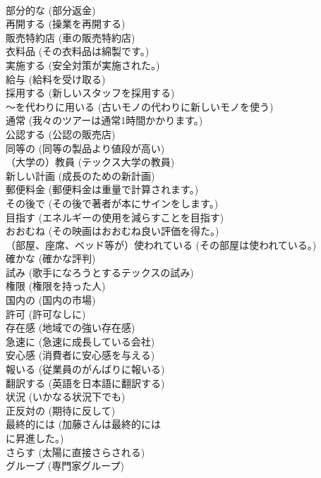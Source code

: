 \documentclass[8pt]{extreport}
\begin{document}
\begin{CJK}{UTF8}{min}
\\	部分的な	(部分返金)		
\\	再開する	(操業を再開する)		
\\	販売特約店	(車の販売特約店)		
\\	衣料品	(その衣料品は綿製です。)		
\\	実施する	(安全対策が実施された。)		
\\	給与	(給料を受け取る)		
\\	採用する	(新しいスタッフを採用する)		
\\	～を代わりに用いる	(古いモノの代わりに新しいモノを使う)		
\\	通常	(我々のツアーは通常1時間かかります。)		
\\	公認する	(公認の販売店)		
\\	同等の	(同等の製品より値段が高い)		
\\	（大学の）教員	(テックス大学の教員)		
\\	新しい計画	(成長のための新計画)		
\\	郵便料金	(郵便料金は重量で計算されます。)		
\\	その後で	(その後で著者が本にサインをします。)		
\\	目指す	(エネルギーの使用を減らすことを目指す)		
\\	おおむね	(その映画はおおむね良い評価を得た。)		
\\	（部屋、座席、ベッド等が）使われている	(その部屋は使われている。)		
\\	確かな	(確かな評判)		
\\	試み	(歌手になろうとするテックスの試み)		
\\	権限	(権限を持った人)		
\\	国内の	(国内の市場)		
\\	許可	(許可なしに)		
\\	存在感	(地域での強い存在感)		
\\	急速に	(急速に成長している会社)		
\\	安心感	(消費者に安心感を与える)		
\\	報いる	(従業員のがんばりに報いる)		
\\	翻訳する	(英語を日本語に翻訳する)		
\\	状況	(いかなる状況下でも)		
\\	正反対の	(期待に反して)		
\\	最終的には	(加藤さんは最終的には
\\	に昇進した。)		
\\	さらす	(太陽に直接さらされる)		
\\	グループ	(専門家グループ)		

\end{CJK}
\end{document}
